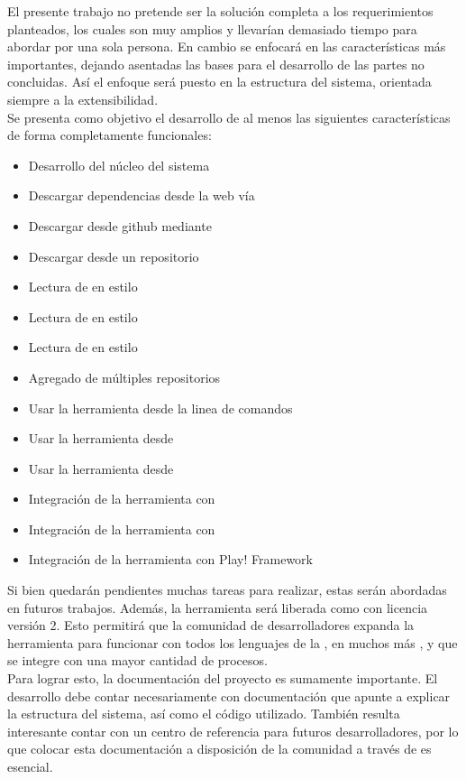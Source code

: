 El presente trabajo no pretende ser la solución completa a los requerimientos
planteados, los cuales son muy amplios y llevarían demasiado tiempo para abordar
por una sola persona. En cambio se enfocará en las características más importantes,
dejando asentadas las bases para el desarrollo de las partes no concluidas.
Así el enfoque será puesto en la estructura del sistema, orientada siempre a
la extensibilidad.\\
Se presenta como objetivo el desarrollo de al menos las 
siguientes características de forma completamente funcionales:
\begin{itemize}
	\setlength{\itemsep}{1pt}
	\setlength{\parskip}{0pt}
	\setlength{\parsep}{0pt}
	\item Desarrollo del núcleo del sistema
	\item Descargar dependencias desde la web vía \http
	\item Descargar desde \gls{github} mediante \git
	\item Descargar desde un repositorio \svn
	\item Lectura de \conffiles en \xml estilo \apache \maven
	\item Lectura de \conffiles en \xml estilo \apache \ivy
	\item Lectura de \conffiles en estilo \sbt
	\item Agregado de múltiples repositorios
	\item Usar la herramienta desde la linea de comandos
	\item Usar la herramienta desde \scala
	\item Usar la herramienta desde \java
	\item Integración de la herramienta con \apache \maven
	\item Integración de la herramienta con \sbt
	\item Integración de la herramienta con Play! Framework
\end{itemize}
Si bien quedarán pendientes muchas tareas para realizar, estas serán abordadas
en futuros trabajos. Además, la herramienta será liberada como \freesoft con
licencia \apache versión 2. Esto permitirá que la comunidad de desarrolladores
expanda la herramienta para funcionar con todos los lenguajes de la \jvm, en muchos
más \frameworks, y que se integre con una mayor cantidad de procesos.\\
Para lograr esto, la documentación del proyecto es sumamente importante. El
desarrollo debe contar necesariamente con documentación que apunte a explicar
la estructura del sistema, así como el código utilizado. También resulta
interesante contar con un centro de referencia para futuros desarrolladores,
por lo que colocar esta documentación a disposición de la comunidad a través de
\internet es esencial.
